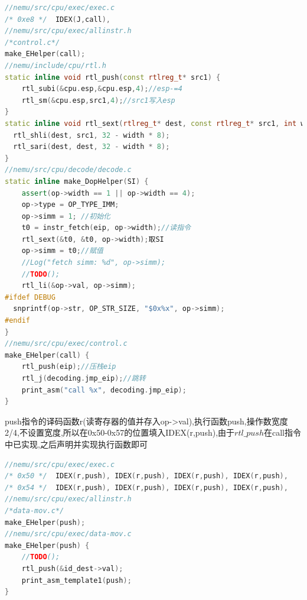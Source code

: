 \documentclass[UTF8,a4paper,10pt]{ctexart}
\begin{document}
{    \begin{lstlisting}[title=call指令实现,frame=trbl,language={C++}]
//nemu/src/cpu/exec/exec.c
/* 0xe8 */	IDEX(J,call), 
//nemu/src/cpu/exec/allinstr.h
/*control.c*/
make_EHelper(call);
//nemu/include/cpu/rtl.h
static inline void rtl_push(const rtlreg_t* src1) {
	rtl_subi(&cpu.esp,&cpu.esp,4);//esp-=4
	rtl_sm(&cpu.esp,src1,4);//src1写入esp
}
static inline void rtl_sext(rtlreg_t* dest, const rtlreg_t* src1, int width) {
  rtl_shli(dest, src1, 32 - width * 8);
  rtl_sari(dest, dest, 32 - width * 8);
}
//nemu/src/cpu/decode/decode.c
static inline make_DopHelper(SI) {
    assert(op->width == 1 || op->width == 4);
    op->type = OP_TYPE_IMM;
    op->simm = 1; //初始化
	t0 = instr_fetch(eip, op->width);//读指令
	rtl_sext(&t0, &t0, op->width);取SI
	op->simm = t0;//赋值
	//Log("fetch simm: %d", op->simm);
    //TODO();
    rtl_li(&op->val, op->simm);
#ifdef DEBUG
  snprintf(op->str, OP_STR_SIZE, "$0x%x", op->simm);
#endif
}
//nemu/src/cpu/exec/control.c
make_EHelper(call) {
    rtl_push(eip);//压栈eip
    rtl_j(decoding.jmp_eip);//跳转
    print_asm("call %x", decoding.jmp_eip);
}
    \end{lstlisting}

    push指令的译码函数r(读寄存器的值并存入op->val),执行函数push,操作数宽度2/4,不设置宽度,所以在0x50-0x57的位置填入IDEX(r,push),由于$rtl\_push$在call指令中已实现,之后声明并实现执行函数即可
    \begin{lstlisting}[title=push指令实现,frame=trbl,language={C++}]
//nemu/src/cpu/exec/exec.c
/* 0x50 */	IDEX(r,push), IDEX(r,push), IDEX(r,push), IDEX(r,push),
/* 0x54 */	IDEX(r,push), IDEX(r,push), IDEX(r,push), IDEX(r,push),
//nemu/src/cpu/exec/allinstr.h
/*data-mov.c*/
make_EHelper(push);
//nemu/src/cpu/exec/data-mov.c
make_EHelper(push) {
    //TODO();
    rtl_push(&id_dest->val);
    print_asm_template1(push);
}
    \end{lstlisting}

}
\end{document}
